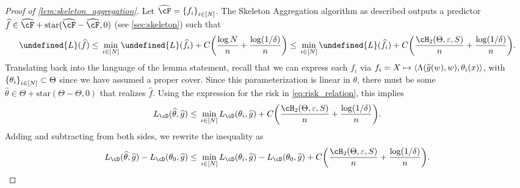 \documentclass[11pt]{article} %
\newcommand{\pref}[1]{\cref{#1}}
\newcommand{\pfref}[1]{Proof of \pref{#1}}
\theoremstyle{theorem}  %
\theoremstyle{plain}
\DeclarePairedDelimiter{\brk}{[}{]}
\DeclarePairedDelimiter{\crl}{\{}{\}}
\DeclarePairedDelimiter{\prn}{(}{)}
\DeclarePairedDelimiter{\tri}{\langle}{\rangle}
\newcommand{\veps}{\varepsilon}
\newcommand{\wt}[1]{\widetilde{#1}}
\newcommand{\wh}[1]{\widehat{#1}}
\let\wt\undefined
\newcommand{\wt}[1]{\widetilde{#1}}
\newcommand{\poprisk}{L_{\cD}}
\newcommand{\starhull}{\mathrm{star}}
\newcommand{\auxL}{\wt{L}}
\newcommand{\varone}{w} %
\newcommand{\vartwo}{x} %
\newcommand{\estone}{\wh{g}}
\newcommand{\esttwo}{\wh{\theta}}
\newcommand{\target}{\Theta}
\newcommand{\gttwo}{\theta_0}
\begin{document}
\begin{proof}[\pfref{lem:skeleton_aggregation}]

Let $\wh{\cF} = \crl*{f_i}_{i\in\brk*{N}}$. The Skeleton Aggregation algorithm as described outputs a predictor $\wh{f}\in\wh{\cF} + \starhull(\wh{\cF}-\wh{\cF},0)$ (see \pref{sec:skeleton}) such that
\[
\auxL(\wh{f})\leq{}\min_{i\in\brk*{N}}\auxL(\wh{f}_i) + C\prn*{
\frac{\log{}N}{n} + \frac{\log(1/\delta)}{n}
} \leq{}
\min_{i\in\brk*{N}}\auxL(\wh{f}_i) + C\prn*{
\frac{\cH_{2}(\target,\veps,S)}{n} + \frac{\log(1/\delta)}{n}
}.
\]
Translating back into the language of the lemma statement, recall that we can express each $f_i$ via $f_i=X\mapsto{}\tri*{\Lambda(\estone(\varone),\varone),\theta_i(\vartwo)}$, with $\crl*{\theta_i}_{i\in\brk*{N}}\subset\target$ since we have assumed a proper cover. Since this parameterization is linear in $\theta$, there must be some $\esttwo\in\target + \starhull(\target-\target,0)$ that realizes $\wh{f}$.
Using the expression for the risk in \pref{eq:risk_relation}, this implies
\[
\poprisk(\esttwo,\estone) \leq{}\min_{i\in\brk*{N}}\poprisk(\theta_i,\estone)  + C\prn*{
\frac{\cH_{2}(\target,\veps,S)}{n} + \frac{\log(1/\delta)}{n}
}.
\]
Adding and subtracting from both sides, we rewrite the inequality as
\begin{equation}
\poprisk(\esttwo,\estone) - \poprisk(\gttwo,\estone) \leq{}\min_{i\in\brk*{N}}\poprisk(\theta_i,\estone) - \poprisk(\gttwo,\estone) + C\prn*{
\frac{\cH_{2}(\target,\veps,S)}{n} + \frac{\log(1/\delta)}{n}
}.\label{eq:skeleton_basic_risk}
\end{equation}
%
%
%
%
%
%
%
%
%
%

%
%
%
%
%
%
%
%
%
%
%
%
%


\end{proof}
\end{document}

